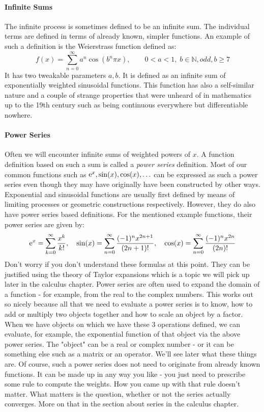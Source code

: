 \paragraph{Infinite Sums}
The infinite process is sometimes defined to be an infinite sum. The individual terms are defined in terms of already known, simpler functions. An example of such a definition is the Weierstrass function defined as:
\begin{equation}
f(x) = \sum_{n=0}^\infty a^n \cos(b^n \pi x), 
\qquad 0 < a < 1, \; b \in \mathbb{N}, odd, b \geq 7
\end{equation}
It has two tweakable parameters $a,b$. It is defined as an infinite sum of exponentially weighted sinusoidal functions. This function has also a self-similar nature and a couple of strange properties that were unheard of in mathematics up to the 19th century such as being continuous everywhere but differentiable nowhere.

\paragraph{Power Series}
Often we will encounter infinite sums of weighted powers of $x$. A function definition based on such a sum is called a \emph{power series} definition. Most of our common functions such as $\operatorname{\mathrm{e}}^x, \sin(x), \cos(x), \ldots$ can be expressed as such a power series even though they may have originally have been constructed by other ways. Exponential and sinusoidal functions are usually first defined by means of limiting processes or geometric constructions respectively. However, they do also have power series based definitions. For the mentioned example functions, their power series are given by:
\begin{equation}
\operatorname{\mathrm{e}}^x    = \sum_{k=0}^\infty   \frac{x^k}{k!}, \quad
\sin(x) = \sum_{n=0}^{\infty} \frac{(-1)^n x^{2n+1}}{(2n+1)!}, \quad
\cos(x) = \sum_{n=0}^{\infty} \frac{(-1)^n x^{2n}  }{(2n)!}
\end{equation}
Don't worry if you don't understand these formulas at this point. They can be justified using the theory of Taylor expansions which is a topic we will pick up later in the calculus chapter. Power series are often used to expand the domain of a function - for example, from the real to the complex numbers. This works out so nicely because all that we need to evaluate a power series is to know, how to add or multiply two objects together and how to scale an object by a factor. When we have objects on which we have these 3 operations defined, we can evaluate, for example, the exponential function of that object via the above power series. The "object" can be a real or complex number - or it can be something else such as a matrix or an operator. We'll see later what these things are. Of course, such a power series does not need to originate from already known functions. It can be made up in any way you like - you just need to prescribe some rule to compute the weights. How you came up with that rule doesn't matter. What matters is the question, whether or not the series actually converges. More on that in the section about series in the calculus chapter.

